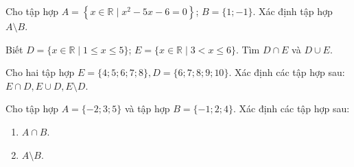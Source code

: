 \begin{bt}%
\begin{listEX}
\item Cho tập hợp $A=\left\{x \in \mathbb{R}\mid x^2-5 x-6=0\right\}$; $B=\{1 ;-1\}$. Xác định tập hợp $A \setminus B$.
\item Biết $D=\{x \in \mathbb{R}\mid 1 \leq x \leq 5\}$; $E=\{x \in \mathbb{R}\mid 3<x \leq 6\}$. Tìm $D \cap E$ và $D \cup E$.
\end{listEX}
\loigiai{
	\begin{listEX}
		\item Ta  có $x^2-5x-6=0\Leftrightarrow \hoac{&x=-1\\&x=6.}$\\
		Suy ra $A=\{-1;6\}$.\\
		Vậy  $A \setminus B=\{6\}$.
		\item Ta có $D=[1;5]$, $E=(3;6]$.\\
		Suy ra $D \cap E=(3;5]$; $D \cup E=[1;6]$.
	\end{listEX}
}
\end{bt}

\begin{bt}%
	Cho hai tập hợp $E=\{4 ; 5 ; 6 ; 7 ; 8\}, D=\{6 ; 7 ; 8 ; 9 ; 10\}$. Xác định các tập hợp sau: $E \cap D, E \cup D, E \setminus  D$.
\end{bt}

\begin{bt}%
Cho tập hợp $A=\{-2 ; 3 ; 5\}$ và tập hợp $B=\{-1 ; 2 ; 4\}$. Xác định các tập hợp sau:
\begin{enumerate}
\item  $A \cap B$.
\item $A\setminus B$.
\end{enumerate}
\end{bt}

